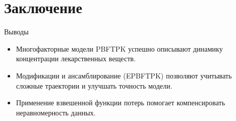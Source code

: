 \documentclass{beamer}
\begin{document}
\section{Заключение}
\begin{frame}{Выводы}
	\begin{itemize}
		\item Многофакторные модели PBFTPK успешно описывают динамику концентрации лекарственных веществ.
		\item Модификации и ансамблирование (EPBFTPK) позволяют учитывать сложные траектории и улучшать точность модели.
		\item Применение взвешенной функции потерь помогает компенсировать неравномерность данных.
	\end{itemize}
\end{frame}
\end{document}
